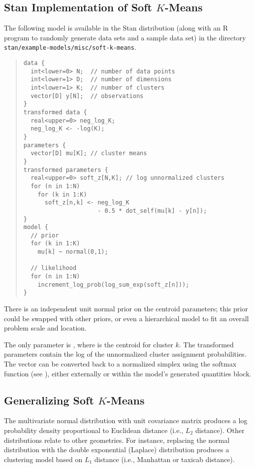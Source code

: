 \subsection{Stan Implementation of Soft $K$-Means}

The following model is available in the Stan distribution (along with
an R program to randomly generate data sets and a sample data set) in
the directory \nolinkurl{stan/example-models/misc/soft-k-means}.
%
\begin{quote}
\begin{Verbatim}[fontsize=\small]
data {
  int<lower=0> N;  // number of data points
  int<lower=1> D;  // number of dimensions
  int<lower=1> K;  // number of clusters
  vector[D] y[N];  // observations
}
transformed data {
  real<upper=0> neg_log_K;
  neg_log_K <- -log(K);
}
parameters {
  vector[D] mu[K]; // cluster means
}
transformed parameters {
  real<upper=0> soft_z[N,K]; // log unnormalized clusters
  for (n in 1:N)
    for (k in 1:K)
      soft_z[n,k] <- neg_log_K 
                     - 0.5 * dot_self(mu[k] - y[n]);
}
model {
  // prior
  for (k in 1:K)
    mu[k] ~ normal(0,1);

  // likelihood
  for (n in 1:N)
    increment_log_prob(log_sum_exp(soft_z[n])); 
}
\end{Verbatim}
\end{quote}
%
There is an independent unit normal prior on the centroid parameters;
this prior could be swapped with other priors, or even a hierarchical
model to fit an overall problem scale and location.

The only parameter is , where  is the centroid
for cluster $k$.  The transformed parameters  contain
the log of the unnormalized cluster assignment probabilities.  The
vector  can be converted back to a normalized simplex
using the softmax function (see ), either externally
or within the model's generated quantities block.

\subsection{Generalizing Soft $K$-Means}

The multivariate normal distribution with unit covariance matrix
produces a log probability density proportional to Euclidean distance
(i.e., $L_2$ distance).  Other distributions relate to other
geometries.  For instance, replacing the normal distribution with the
double exponential (Laplace) distribution produces a clustering model
based on $L_1$ distance (i.e., Manhattan or taxicab
distance). 

